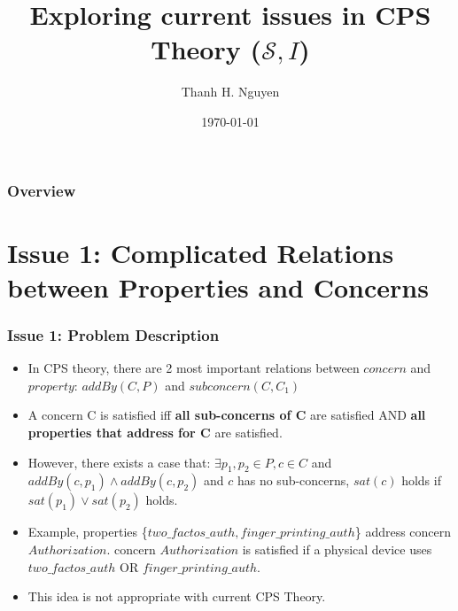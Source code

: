 \documentclass{beamer}
\title[Truthworthiness value]{Exploring current issues in CPS Theory ($\mathcal{S},I$)} %
\author{Thanh H. Nguyen} %
\institute[NMSU] %
{
New Mexico State University \\ %
\medskip
\textit{tnguyen@cs.nmsu.edu} %
}
\date{\today} %
\begin{document}
\begin{frame}
\titlepage %
\end{frame}


\begin{frame}
\frametitle{Overview} %
\tableofcontents %
\end{frame}


\section{Issue 1: Complicated Relations between Properties and Concerns} 
\begin{frame}
	\frametitle{Issue 1: Problem Description}
	\begin{itemize}
		\item In CPS theory, there are 2 most important relations between $concern$ and $property$: $addBy(C,P)$ and $subconcern(C,C_1)$
		\item A concern C is satisfied iff {\bf all sub-concerns of C} are satisfied AND {\bf all properties that address for C} are satisfied.
		\item However, there exists a case that: $\exists p_1,p_2 \in P, c \in C$ and $addBy(c,p_1) \land addBy(c,p_2)$ and $c$ has no sub-concerns, $sat(c)$ holds if $sat(p_1) \lor sat(p_2)$ holds.
		\item Example, properties \{$two\_factos\_auth, finger\_printing\_auth$\} address concern $Authorization$.  concern $Authorization$ is satisfied if a physical device uses $two\_factos\_auth$ OR $finger\_printing\_auth$. 
		\item This idea is not appropriate with current CPS Theory.
	\end{itemize}
\end{frame}
\end{document}
